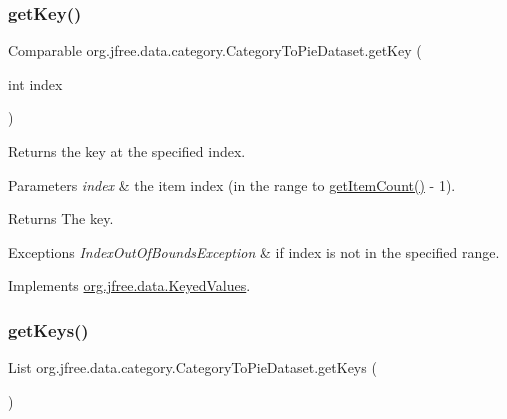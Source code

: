 \subsubsection{\texorpdfstring{get\+Key()}{getKey()}}
{\footnotesize\ttfamily Comparable org.\+jfree.\+data.\+category.\+Category\+To\+Pie\+Dataset.\+get\+Key (\begin{DoxyParamCaption}\item[{int}]{index }\end{DoxyParamCaption})}

Returns the key at the specified index.


\begin{DoxyParams}{Parameters}
{\em index} & the item index (in the range {} to {\ttfamily \mbox{\hyperlink{classorg_1_1jfree_1_1data_1_1category_1_1_category_to_pie_dataset_a7536f863e26d692f65131df0ed9150c3}{get\+Item\+Count()}} -\/ 1}).\\
\hline
\end{DoxyParams}
\begin{DoxyReturn}{Returns}
The key.
\end{DoxyReturn}

\begin{DoxyExceptions}{Exceptions}
{\em Index\+Out\+Of\+Bounds\+Exception} & if {\ttfamily index} is not in the specified range. \\
\hline
\end{DoxyExceptions}


Implements \mbox{\hyperlink{interfaceorg_1_1jfree_1_1data_1_1_keyed_values_a830386de8513342d99845bbd9cb57bc4}{org.\+jfree.\+data.\+Keyed\+Values}}.

\mbox{\label{classorg_1_1jfree_1_1data_1_1category_1_1_category_to_pie_dataset_aa8974b76f827b4dc093f0d6b66752c1c}} 
\subsubsection{\texorpdfstring{get\+Keys()}{getKeys()}}
{\footnotesize\ttfamily List org.\+jfree.\+data.\+category.\+Category\+To\+Pie\+Dataset.\+get\+Keys (\begin{DoxyParamCaption}{ }\end{DoxyParamCaption})}

